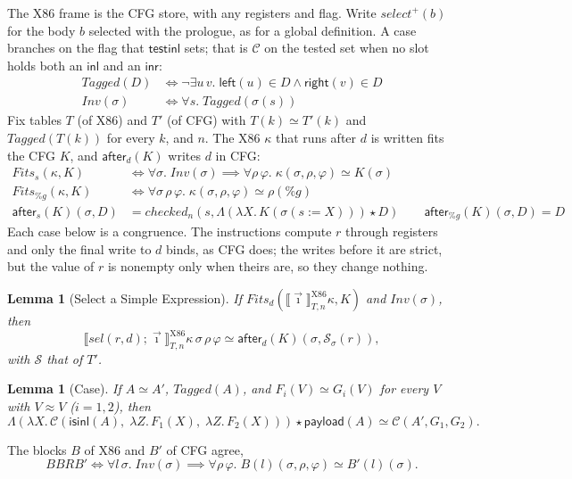 \documentclass[10pt]{article}
\theoremstyle{acmplain}
\newtheorem{lemma}[theorem]{Lemma}
\newcommand{\SEM}[1]{\llbracket #1 \rrbracket}
\newcommand{\key}[1]{\mathsf{#1}}
\newcommand{\pass}[1]{\mathit{#1}}
\newcommand{\Left}[1]{\key{left}(#1)}
\newcommand{\Right}[1]{\key{right}(#1)}
\newcommand{\ext}[3]{#1(#2{:=}#3)}
\newcommand{\app}{\star}
\begin{document}
The X86 frame is the CFG store, with any registers and flag. Write
$\pass{select}^{+}(b)$ for the body $b$ selected with the prologue, as
for a global definition. A case branches on the flag that $\key{testinl}$
sets; that is $\mathcal{C}$ on the tested set when no slot holds both an
$\key{inl}$ and an $\key{inr}$:
\begin{align*}
  \mathit{Tagged}(D) &\iff \neg\exists u\, v.\; \Left{u} \in D \land \Right{v} \in D \\
  \mathit{Inv}(\sigma) &\iff \forall s.\; \mathit{Tagged}(\sigma(s))
\end{align*}
Fix tables $T$ (of X86) and $T'$ (of CFG) with $T(k) \simeq T'(k)$ and
$\mathit{Tagged}(T(k))$ for every $k$, and $n$. The X86 $\kappa$ that
runs after $d$ is written fits the CFG $K$, and $\key{after}_d(K)$
writes $d$ in CFG:
\begin{align*}
  \mathit{Fits}_s(\kappa, K) &\iff \forall \sigma.\; \mathit{Inv}(\sigma) \implies
    \forall \rho\, \varphi.\; \kappa(\sigma, \rho, \varphi) \simeq K(\sigma) \\
  \mathit{Fits}_{\%g}(\kappa, K) &\iff \forall \sigma\, \rho\, \varphi.\; \kappa(\sigma, \rho, \varphi) \simeq \rho(\%g) \\
  \key{after}_s(K)(\sigma, D) &= \mathit{checked}_n(s, \Lambda(\lambda X.\, K(\ext{\sigma}{s}{X})) \app D) \qquad
  \key{after}_{\%g}(K)(\sigma, D) = D
\end{align*}
Each case below is a congruence. The instructions compute $r$ through
registers and only the final write to $d$ binds, as CFG does; the writes
before it are strict, but the value of $r$ is nonempty only when theirs
are, so they change nothing.

\begin{lemma}[Select a Simple Expression]\label{lem:sel}
If $\mathit{Fits}_d(\SEM{\vec{\imath}}^{\mathrm{X86}}_{T,n}\kappa, K)$ and $\mathit{Inv}(\sigma)$, then
\[
  \SEM{\pass{sel}(r, d); \vec{\imath}}^{\mathrm{X86}}_{T,n}\kappa\,\sigma\,\rho\,\varphi
  \simeq \key{after}_d(K)(\sigma, \mathcal{S}_\sigma(r)) ,
\]
with $\mathcal{S}$ that of $T'$.
\end{lemma}

\begin{lemma}[Case]\label{lem:case-core}
If $A \simeq A'$, $\mathit{Tagged}(A)$, and $F_i(V) \simeq G_i(V)$ for
every $V$ with $V \approx V$ ($i = 1, 2$), then
\[
  \Lambda(\lambda X.\, \mathcal{C}(\key{isinl}(A),\; \lambda Z.\, F_1(X),\; \lambda Z.\, F_2(X))) \app \key{payload}(A)
  \simeq \mathcal{C}(A', G_1, G_2) .
\]
\end{lemma}
The blocks $B$ of X86 and $B'$ of CFG agree,
\[
  B \mathrel{\mathit{BR}} B' \iff \forall l\, \sigma.\; \mathit{Inv}(\sigma) \implies
    \forall \rho\, \varphi.\; B(l)(\sigma, \rho, \varphi) \simeq B'(l)(\sigma) .
\]
\end{document}
